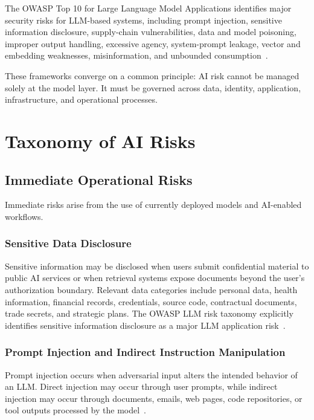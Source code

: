 \documentclass[conference]{IEEEtran}
\begin{document}
The OWASP Top 10 for Large Language Model Applications identifies major security risks for LLM-based systems, including prompt injection, sensitive information disclosure, supply-chain vulnerabilities, data and model poisoning, improper output handling, excessive agency, system-prompt leakage, vector and embedding weaknesses, misinformation, and unbounded consumption~\cite{owasp_llm_top10,owasp_prompt_injection,owasp_llm_risks}.

These frameworks converge on a common principle: AI risk cannot be managed solely at the model layer. It must be governed across data, identity, application, infrastructure, and operational processes.

\section{Taxonomy of AI Risks}

\subsection{Immediate Operational Risks}

Immediate risks arise from the use of currently deployed models and AI-enabled workflows.

\subsubsection{Sensitive Data Disclosure}

Sensitive information may be disclosed when users submit confidential material to public AI services or when retrieval systems expose documents beyond the user's authorization boundary. Relevant data categories include personal data, health information, financial records, credentials, source code, contractual documents, trade secrets, and strategic plans. The OWASP LLM risk taxonomy explicitly identifies sensitive information disclosure as a major LLM application risk~\cite{owasp_llm_top10}.

\subsubsection{Prompt Injection and Indirect Instruction Manipulation}

Prompt injection occurs when adversarial input alters the intended behavior of an LLM. Direct injection may occur through user prompts, while indirect injection may occur through documents, emails, web pages, code repositories, or tool outputs processed by the model~\cite{owasp_prompt_injection}.
\end{document}
